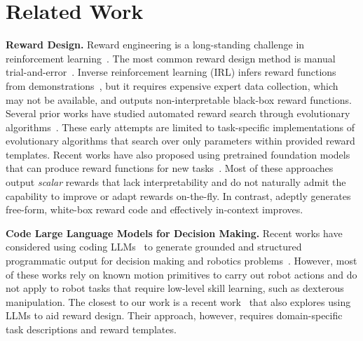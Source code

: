 \vspace{-0.3cm}
\section{Related Work}
\vspace{-0.3cm}







\textbf{Reward Design.} 
Reward engineering is a long-standing challenge in reinforcement learning~\citep{singh2010where, sutton2018reinforcement}. The most common reward design method is manual trial-and-error~\citep{knox2023reward, booth2023perils}. Inverse reinforcement learning (IRL) infers reward functions from demonstrations~\citep{abbeel2004apprenticeship, ziebart2008maximum, ho2016generative}, but it requires expensive expert data collection, which may not be available, and outputs non-interpretable black-box reward functions. Several prior works have studied automated reward search through evolutionary algorithms~\citep{niekum2010genetic, chiang2019learning, faust2019evolving}. These early attempts are limited to task-specific implementations of evolutionary algorithms that search over only parameters within provided reward templates. Recent works have also proposed using pretrained foundation models that can produce reward functions for new tasks~\citep{ma2022vip, ma2023liv, fan2022minedojo, du2023vision, karamcheti2023language, du2023guiding, kwon2023reward}. Most of these approaches output \textit{scalar} rewards that lack interpretability and do not naturally admit the capability to improve or adapt rewards on-the-fly. In contrast, \ourmethod adeptly generates free-form, white-box reward code and effectively in-context improves. 










\textbf{Code Large Language Models for Decision Making.}
Recent works have considered using coding LLMs~\citep{austin2021program, chen2021evaluating, roziere2023code} to generate grounded and structured programmatic output for decision making and robotics problems~\citep{liang2023code, singh2023progprompt, wang2023demo2code, huang2023instruct2act, wang2023voyager, liu2023llm+, silver2023generalized, ding2023task, lin2023text2motion, xie2023translating}. However, most of these works rely on known motion primitives to carry out robot actions and do not apply to robot tasks that require low-level skill learning, such as dexterous manipulation. The closest to our work is a recent work~\citep{yu2023language} that also explores using LLMs to aid reward design. Their approach, however, requires domain-specific task descriptions and reward templates.















